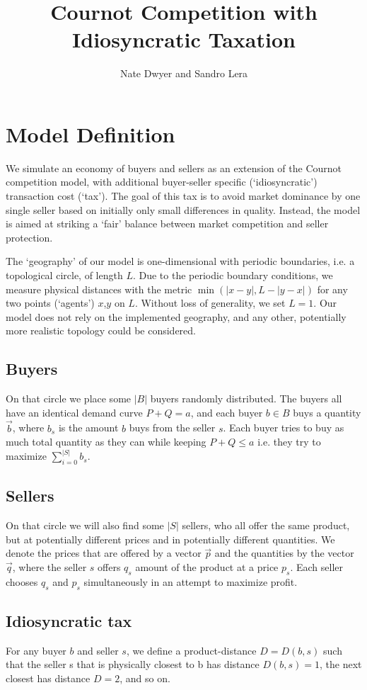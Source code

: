 \documentclass[11pt]{article}
\title{Cournot Competition with Idiosyncratic Taxation}
\author{Nate Dwyer and Sandro Lera}
\begin{document}
\maketitle
\setcounter{section}{0}
\section{Model Definition}
We simulate an economy of buyers and sellers as an extension of the Cournot
competition model, with additional buyer-seller specific (`idiosyncratic')
transaction cost (`tax').  The goal of this tax is to avoid market dominance by
one single seller based on initially only small differences in quality.
Instead, the model is aimed at striking a `fair' balance between market
competition and seller protection. 

The `geography' of our model is one-dimensional with periodic boundaries, i.e. a
topological circle, of length $L$.  Due to the periodic boundary conditions, we
measure physical distances with the metric $\min(|x-y|, L-|y-x|)$ for any two
points (`agents') $x$,$y$ on $L$.  Without loss of generality, we set $L=1$.
Our model does not rely on the implemented geography, and any other, potentially
more realistic topology could be considered. 

\subsection{Buyers}
On that circle we place some $|B|$ buyers randomly distributed. The buyers all
have an identical demand curve $P + Q = a$, and each buyer $b\in B$ buys a
quantity $\vec{b}$, where $b_s$ is the amount $b$ buys from the seller $s$. Each
buyer tries to buy as much total quantity as they can while keeping $P + Q \le
a$ i.e.  they try to maximize $\sum_{i=0}^{|S|}b_s$. 

\subsection{Sellers}
On that circle we will also find some $|S|$ sellers, who all offer the same
product, but at potentially different prices and in potentially different
quantities. We denote the prices that are offered by a vector $\vec{p}$ and the
quantities by the vector $\vec{q}$, where the seller $s$ offers $q_s$ amount of
the product at a price $p_s$. Each seller chooses $q_s$ and $p_s$ simultaneously
in an attempt to maximize profit.  

\subsection{Idiosyncratic tax}
For any buyer $b$ and seller $s$, we define a product-distance $D = D(b,s)$ such
that the seller s that is physically closest to b has distance $D(b,s)=1$, the
next closest has distance $D=2$, and so on. 
\end{document}
